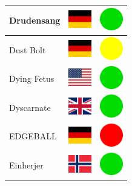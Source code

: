\documentclass[12pt, a4paper, twoside]{report}
\begin{document}
\begin{center}
\begin{longtable}{|p{5cm}|p{2cm}|p{2cm}|}
 Drudensang                                                 & \includegraphics[width=1cm]{../img/flags/de} &   \includegraphics[width=1cm]{../likes/y} \\ \hline
 Dust Bolt                                                  & \includegraphics[width=1cm]{../img/flags/de} &   \includegraphics[width=1cm]{../likes/m} \\ \hline
 Dying Fetus                                                & \includegraphics[width=1cm]{../img/flags/us} &   \includegraphics[width=1cm]{../likes/y} \\ \hline
 Dyscarnate                                                 & \includegraphics[width=1cm]{../img/flags/gb} &   \includegraphics[width=1cm]{../likes/y} \\ \hline
 EDGEBALL                                                   & \includegraphics[width=1cm]{../img/flags/de} &   \includegraphics[width=1cm]{../likes/n} \\ \hline
 Einherjer                                                  & \includegraphics[width=1cm]{../img/flags/no} &   \includegraphics[width=1cm]{../likes/y} \\ \hline

\end{longtable}
\end{center}
\end{document}
